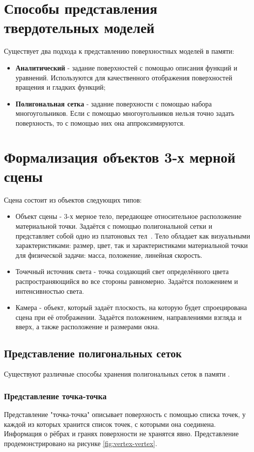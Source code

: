 \section{Способы представления твердотельных моделей}
Существует два подхода к представлению поверхностных моделей в памяти:
\begin{itemize}
	\item \textbf{Аналитический} - задание поверхностей с помощью описания функций и уравнений. Используются для качественного отображения поверхностей вращения и гладких функций;
	\item \textbf{Полигональная сетка} - задание поверхности с помощью набора многоугольников. Если с помощью многоугольников нельзя точно задать поверхность, то с помощью них она аппроксимируются.
\end{itemize}

\section{Формализация объектов 3-х мерной сцены}

Сцена состоит из объектов следующих типов:
\begin{itemize}
	\item Объект сцены - 3-х мерное тело, передающее относительное расположение материальной точки. Задаётся с помощью полигональной сетки и представляет собой одно из платоновых тел~\cite{platon-body}. Тело обладает как визуальными характеристиками: размер, цвет, так и характеристиками материальной точки для физической задачи: масса, положение, линейная скорость.
	\item Точечный источник света - точка создающий свет определённого цвета распространяющийся во все стороны равномерно. Задаётся положением и интенсивностью света.
	\item Камера - объект, который задаёт плоскость, на которую будет спроецирована сцена при её отображении. Задаётся положением, направлениями взгляда и вверх, а также расположение и размерами окна.
\end{itemize}


\subsection{Представление полигональных сеток}
Существуют различные способы хранения полигональных сеток в памяти \cite{colins}.

\subsubsection{Представление точка-точка}
Представление "точка-точка" описывает поверхность с помощью списка точек, у каждой из которых хранится список точек, с которыми она соединена. Информация о рёбрах и гранях поверхности не хранятся явно. Представление продемонстрировано на рисунке \ref{fig:vertex-vertex}.

